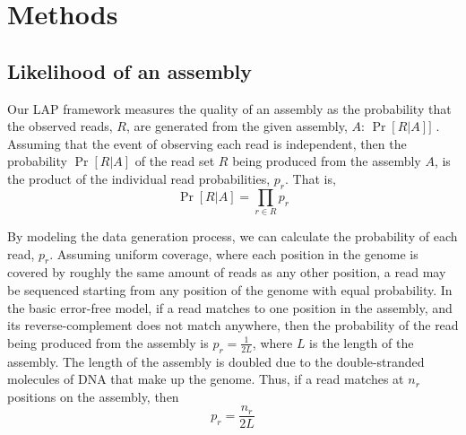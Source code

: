 

\section{Methods}
\subsection{Likelihood of an assembly}

Our LAP framework measures the quality of an assembly as the probability that the observed reads, $R$, are generated from the given assembly, $A$: $\Pr[R|A]]$ \cite{LAP}.
Assuming that the event of observing each read is independent, then the probability $\Pr[R|A]$ of the read set $R$ being produced from the assembly $A$, is the product of the individual read probabilities, $p_r$.  That is,
\begin{equation}
  \label{probability_reads_given_assembly}
  \Pr[R \vert A]=\prod_{r \in R} p_r
\end{equation}

By modeling the data generation process, we can calculate the probability of each read, $p_r$.
Assuming uniform coverage, where each position in the genome is covered by roughly the same amount of reads as any other position, a read may be sequenced starting from any position of the genome with equal probability.
In the basic error-free model, if a read matches to one position in the assembly, and its reverse-complement does not match anywhere, then the probability of the read being produced from the assembly is $p_r=\frac{1}{2L}$, where $L$ is the length of the assembly.
The length of the assembly is doubled due to the double-stranded molecules of DNA that make up the genome.
Thus, if a read
matches at $n_r$ positions on the assembly, then
\begin{equation}
  \label{error_free_probability}
  p_r = \frac{n_r}{2L}
\end{equation}

